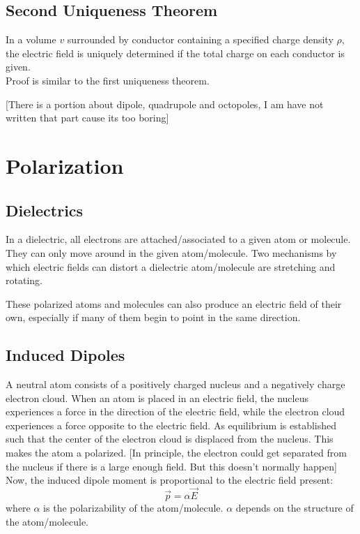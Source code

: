 \documentclass{article}
\begin{document}
\subsection{Second Uniqueness Theorem}
In a volume $v$ surrounded by conductor containing a specified charge density $\rho$, the electric field is uniquely determined if the total charge on each conductor is given.\\
Proof is similar to the first uniqueness theorem.

	[There is a portion about dipole, quadrupole and octopoles, I am have not written that part cause its too boring]

\section{Polarization}
\subsection{Dielectrics}
In a dielectric, all electrons are attached/associated to a given atom or molecule.
They can only move around in the given atom/molecule.
Two mechanisms by which electric fields can distort a dielectric atom/molecule are stretching and rotating.

These polarized atoms and molecules can also produce an electric field of their own, especially if many of them begin to point in the same direction.
\subsection{Induced Dipoles}
A neutral atom consists of a positively charged nucleus and a negatively charge electron cloud.
When an atom is placed in an electric field, the nucleus experiences a force in the direction of the electric field, while the electron cloud experiences a force opposite to the electric field.
As equilibrium is established such that the center of the electron cloud is displaced from the nucleus.
This makes the atom a polarized.
	[In principle, the electron could get separated from the nucleus if there is a large enough field. But this doesn't normally happen]\\
Now, the induced dipole moment is proportional to the electric field present:
\[ \vec{p} = \alpha \vec{E} \]
where $\alpha$ is the polarizability of the atom/molecule. $\alpha$ depends on the structure of the atom/molecule.
\end{document}
